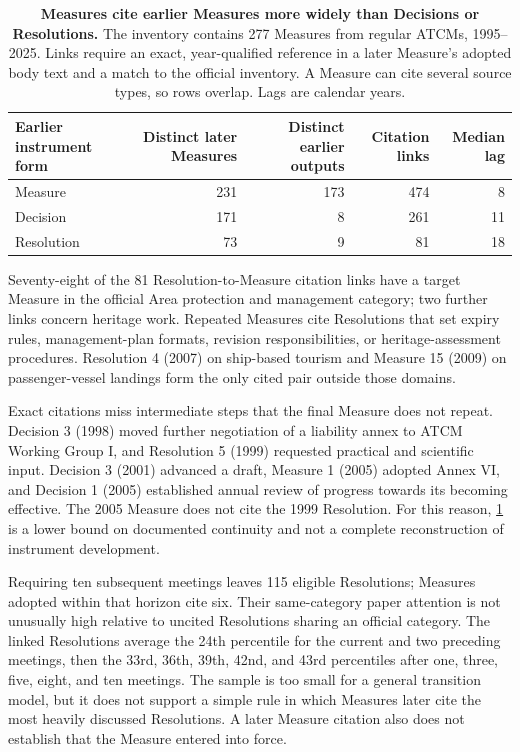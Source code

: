 \documentclass{fun_article}
\begin{document}
\begin{table}[!htbp]
\centering
\scriptsize
\caption{\textbf{Measures cite earlier Measures more widely than Decisions or Resolutions.} The inventory contains 277 Measures from regular ATCMs, 1995--2025. Links require an exact, year-qualified reference in a later Measure's adopted body text and a match to the official inventory. A Measure can cite several source types, so rows overlap. Lags are calendar years.}
\label{tab:measure-formal-inheritance}
\begin{tabular}{@{}lrrrr@{}}
\toprule
Earlier instrument form & Distinct later Measures & Distinct earlier outputs & Citation links & Median lag \\
\midrule
Measure & 231 & 173 & 474 & 8 \\
Decision & 171 & 8 & 261 & 11 \\
Resolution & 73 & 9 & 81 & 18 \\
\bottomrule
\end{tabular}
\end{table}

Seventy-eight of the 81 Resolution-to-Measure citation links have a target Measure in the official Area protection and management category; two further links concern heritage work. Repeated Measures cite Resolutions that set expiry rules, management-plan formats, revision responsibilities, or heritage-assessment procedures. Resolution 4 (2007) on ship-based tourism and Measure 15 (2009) on passenger-vessel landings form the only cited pair outside those domains.

Exact citations miss intermediate steps that the final Measure does not repeat. Decision 3 (1998) moved further negotiation of a liability annex to ATCM Working Group I, and Resolution 5 (1999) requested practical and scientific input. Decision 3 (2001) advanced a draft, Measure 1 (2005) adopted Annex VI, and Decision 1 (2005) established annual review of progress towards its becoming effective. The 2005 Measure does not cite the 1999 Resolution. For this reason, \cref{tab:measure-formal-inheritance} is a lower bound on documented continuity and not a complete reconstruction of instrument development.

Requiring ten subsequent meetings leaves 115 eligible Resolutions; Measures adopted within that horizon cite six. Their same-category paper attention is not unusually high relative to uncited Resolutions sharing an official category. The linked Resolutions average the 24th percentile for the current and two preceding meetings, then the 33rd, 36th, 39th, 42nd, and 43rd percentiles after one, three, five, eight, and ten meetings. The sample is too small for a general transition model, but it does not support a simple rule in which Measures later cite the most heavily discussed Resolutions. A later Measure citation also does not establish that the Measure entered into force.
\end{document}
